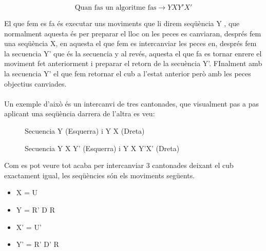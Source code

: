 $$ \textrm{Quan fas un algoritme fas} \rightarrow Y X Y' X' $$

El que fem es fa és executar uns moviments que li direm seqüència Y , que normalment aquesta és per preparar el lloc on les peces es canviaran, després fem una seqüència X, en aquesta el que fem es intercanviar les peces en, després fem la secuencia Y' que és la secuencia y al revés, aquesta el que fa es tornar enrere el moviment fet anteriorment i preparar el retorn de la secuència Y'. FInalment amb la secuencia Y' el que fem retornar el cub a l'estat anterior però amb les peces objectius canviades.
\\\\Un exemple d'això és un intercanvi de tres cantonades, que visualment pas a pas aplicant una seqüència darrera de l'altra es veu:

\begin{figure}[htbp]
    \centering
    \begin{subfigure}
        \centering\RubikCubeSolvedWY
    \end{subfigure}
    \begin{subfigure}
        \centering\RubikCubeSolvedWY
    \end{subfigure}
    \caption{Secuencia Y (Esquerra) i Y X (Dreta)}
\end{figure}

\begin{figure}[htbp]
    \centering
    \begin{subfigure}
        \centering\RubikCubeSolvedWY
    \end{subfigure}
    \begin{subfigure}
        \centering\RubikCubeSolvedWY
    \end{subfigure}
    \caption{Secuencia Y X Y' (Esquerra) i Y X Y'X' (Dreta)}
\end{figure}

Com es pot veure tot acaba per intercanviar 3 cantonades deixant el cub exactament igual, les seqüències són els moviments següents.
\begin{itemize}
    \item X = U
    \item Y = R' D R
    \item X' = U'
    \item Y' = R' D' R
\end{itemize}

